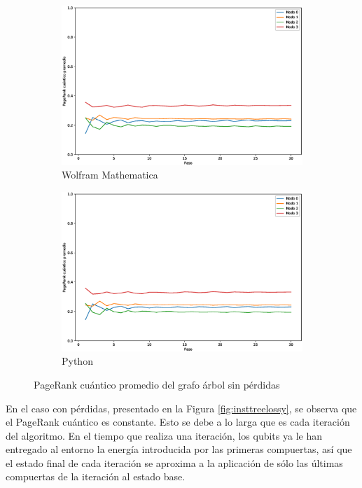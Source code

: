 \begin{figure}[H]
    \centering
    \begin{subfigure}[m]{0.45\textwidth}
        \centering
        \includegraphics[width=0.9\linewidth]{img/tree-mean-M.eps}
        \caption{Wolfram Mathematica}
    \end{subfigure}
    \begin{subfigure}[m]{0.45\textwidth}
        \centering
        \includegraphics[width=0.9\linewidth]{img/tree-mean-lossless.eps}
        \caption{Python}
    \end{subfigure}
    \caption[PageRank cuántico promedio del grafo árbol sin pérdidas]{PageRank cuántico promedio del grafo árbol sin pérdidas}
    \label{fig:meantreelossless}
\end{figure}

En el caso con pérdidas, presentado en la Figura \ref{fig:insttreelossy}, se observa que el PageRank cuántico es constante. Esto se debe a lo larga que es cada iteración del algoritmo. En el tiempo que realiza una iteración, los qubits ya le han entregado al entorno la energía introducida por las primeras compuertas, así que el estado final de cada iteración se aproxima a la aplicación de sólo las últimas compuertas de la iteración al estado base.

